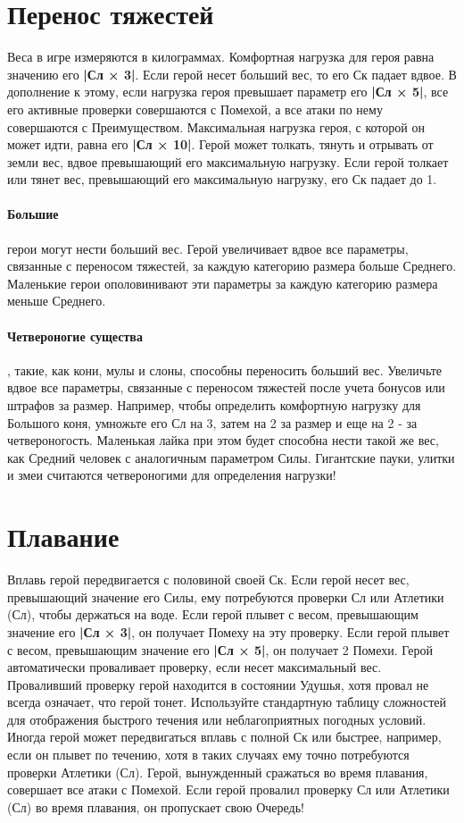 



\section{Перенос тяжестей}
Веса в игре измеряются в килограммах. Комфортная нагрузка для героя равна значению его \textbf{|Сл × 3|}. Если герой несет больший вес, то его Ск падает вдвое. В дополнение к этому, если нагрузка героя превышает параметр его \textbf{|Сл × 5|}, все его активные проверки совершаются с Помехой, а все атаки по нему совершаются с Преимуществом. Максимальная нагрузка героя, с которой он может идти, равна его \textbf{|Сл × 10|}.
\newline
Герой может толкать, тянуть и отрывать от земли вес, вдвое превышающий его максимальную нагрузку. Если герой толкает или тянет вес, превышающий его максимальную нагрузку, его Ск падает до 1.
\paragraph{Большие} герои могут нести больший вес. Герой увеличивает вдвое все параметры, связанные с переносом тяжестей, за каждую категорию размера больше Среднего. Маленькие герои ополовинивают эти параметры за каждую категорию размера меньше Среднего.
\paragraph{Четвероногие существа}, такие, как кони, мулы и слоны, способны переносить больший вес. Увеличьте вдвое все параметры, связанные с переносом тяжестей после учета бонусов или штрафов за размер. Например, чтобы определить комфортную нагрузку для Большого коня, умножьте его Сл на 3, затем на 2 за размер и еще на 2 - за четвероногость. Маленькая лайка при этом будет способна нести такой же вес, как Средний человек с аналогичным параметром Силы. Гигантские пауки, улитки и змеи считаются четвероногими для определения нагрузки!
\section{Плавание}
Вплавь герой передвигается с половиной своей Ск. Если герой несет вес, превышающий значение его Силы, ему потребуются проверки Сл или Атлетики (Сл), чтобы держаться на воде. Если герой плывет с весом, превышающим значение его \textbf{|Сл × 3|}, он получает Помеху на эту проверку. Если герой плывет с весом, превышающим значение его \textbf{|Сл × 5|}, он получает 2 Помехи. Герой автоматически проваливает проверку, если несет максимальный вес. Проваливший проверку герой находится в состоянии Удушья, хотя провал не всегда означает, что герой тонет. Используйте стандартную таблицу сложностей для отображения быстрого течения или неблагоприятных погодных условий. Иногда герой может передвигаться вплавь с полной Ск или быстрее, например, если он плывет по течению, хотя в таких случаях ему точно потребуются проверки Атлетики (Сл).
\newline
Герой, вынужденный сражаться во время плавания, совершает все атаки с Помехой. Если герой провалил проверку Сл или Атлетики (Сл) во время плавания, он пропускает свою Очередь!
